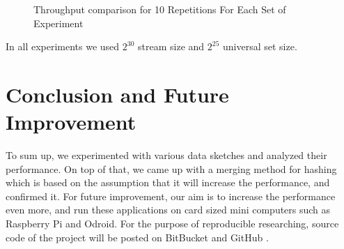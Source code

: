 \documentclass[twoside]{article}
\begin{document}
\begin{figure}[H]
	\begin{multicols}{2}


		



\end{multicols}
\caption{Throughput comparison for 10 Repetitions For Each Set of Experiment}
\end{figure}

In all experiments we used $2^{30}$ stream size and $2^{25}$ universal set size.

\section{Conclusion and Future Improvement}
To sum up, we experimented with various data sketches and analyzed their performance. On top of that, we came up with a merging method for hashing which is based on the assumption that it will increase the performance, and confirmed it. For future improvement, our aim is to increase the performance even more, and run these applications on card sized mini computers such as Raspberry Pi and Odroid. For the purpose of reproducible researching, source code of the project will be posted on BitBucket and GitHub	.
\end{document}
